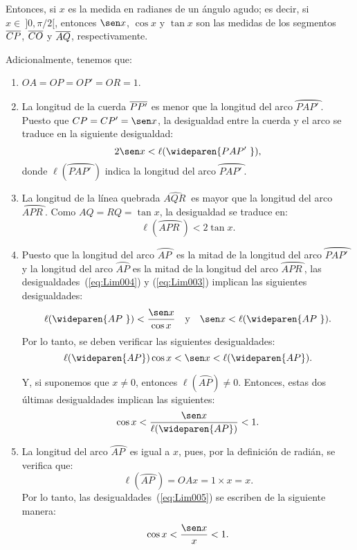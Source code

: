 Entonces, si $x$ es la medida en radianes de un ángulo agudo; es decir, si $x \in\ ]0,\pi/2[$, entonces $\sen x$, $\cos x$ y $\tan
x$ son las medidas de los segmentos $\overline{CP}$, $\overline{CO}$ y $\overline{AQ}$, respectivamente.

Adicionalmente, tenemos que:

\begin{enumerate}
\item $OA = OP = OP' = OR = 1$.
\item La longitud de la cuerda $\overline{PP'}$ es menor que la longitud del arco $\wideparen{PAP'\
    }$. Puesto que $CP = CP' = \sen x$, la desigualdad entre la cuerda y el arco se traduce en
    la siguiente desigualdad:
    \begin{equation}
    \label{eq:Lim003}
    2\sen x < \ell(\wideparen{PAP'\ }),
    \end{equation}
    donde $\ell(\wideparen{PAP'\ })$ indica la longitud del arco $\wideparen{PAP'\ }$.
\item La longitud de la línea quebrada $\widehat{AQR\ }$ es mayor que la longitud del arco
    $\wideparen{ APR\ }$. Como $AQ = RQ = \tan x$, la desigualdad se traduce en:
    \begin{equation}
    \label{eq:Lim004}
    \ell(\wideparen{APR\ }) < 2\tan x.
    \end{equation}
\item Puesto que la longitud del arco $\wideparen{AP\ }$ es la mitad de la longitud del arco
    $\wideparen{PAP'\ }$ y la longitud del arco $\wideparen{AP}$ es la mitad de la longitud del
    arco $\wideparen{APR\ }$, las desigualdades~(\ref{eq:Lim004}) y (\ref{eq:Lim003}) implican
    las siguientes desigualdades:
    \[
        \ell(\wideparen{AP\ }) < \frac{\sen x}{\cos x} \yjc \sen x < \ell(\wideparen{AP\ }).
    \]
    Por lo tanto, se deben verificar las siguientes desigualdades:
    \[
        \ell(\wideparen{AP})\cos x < \sen x < \ell(\wideparen{AP}).
    \]

    Y, si suponemos que $x\neq 0$, entonces $\ell(\wideparen{AP}) \neq 0$. Entonces, estas dos
últimas desigualdades implican las siguientes:
    \begin{equation}
    \label{eq:Lim005}
    \cos x < \frac{\sen x}{\ell(\wideparen{AP})} < 1.
    \end{equation}

\item La longitud del arco $\wideparen{AP\ }$ es igual a $x$, pues, por la definición de
    radián, se verifica que:
    \[
     \ell(\wideparen{AP\ }) = OA x = 1\times x = x.
    \]
    Por lo tanto, las desigualdades~(\ref{eq:Lim005}) se escriben de la siguiente manera:
    \begin{equation}
    \label{eq:Lim006}
    \cos x < \frac{\sen x}{x} < 1.
    \end{equation}
\end{enumerate}

